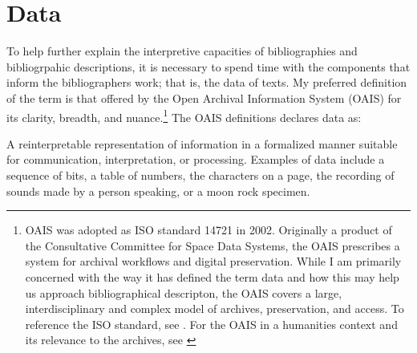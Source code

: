\section{Data}

To help further explain the interpretive capacities of bibliographies and bibliogrpahic descriptions, it is necessary to spend time with the components that inform the bibliographers work; that is, the data of texts. My preferred definition  of the term is that offered by the Open Archival Information System (OAIS) for its clarity, breadth, and nuance.\footnote{OAIS was adopted as ISO standard 14721 in 2002. Originally a product of the Consultative Committee for Space Data Systems, the OAIS prescribes a system for archival workflows and digital preservation. While I am primarily concerned with the way it has defined the term data and how this may help us approach bibliographical descripton, the OAIS covers a large, interdisciplinary and complex model of archives, preservation, and access. \autocite{consultative_committee_for_space_data_systems_reference_2002} To reference the ISO standard, see \autocite{noauthor_iso_2012}. For the OAIS in a humanities context and its relevance to the archives, see \autocite{kirschenbaum_.txtual_2013}} The OAIS definitions declares data as:
\begin{displayquote}
A reinterpretable representation of information in a formalized manner suitable for communication, interpretation, or processing. Examples of data include a sequence of bits, a table of numbers, the characters on a page, the recording of sounds made by a person speaking, or a moon rock specimen.\autocite[1-10]{consultative_committee_for_space_data_systems_reference_2002}
\end{displayquote}
